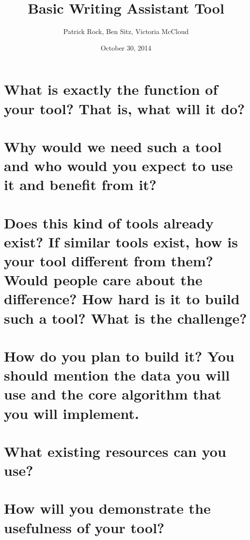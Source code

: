\documentclass{article}
\title{Basic Writing Assistant Tool}
\author{Patrick Rock, Ben Sitz, Victoria McCloud}
\date{October 30, 2014}
\begin{document}
\maketitle

\section{What is exactly the function of your tool? That is, what will it do?}

\section{Why would we need such a tool and who would you expect to use it and benefit from it?}

\section{Does this kind of tools already exist? If similar tools exist, how is your tool different from them? Would people care about the difference? How hard is it to build such a tool? What is the challenge?}

\section{How do you plan to build it? You should mention the data you will use and the core algorithm that you will implement.}

\section{What existing resources can you use?}

\section{How will you demonstrate the usefulness of your tool?}
\end{document}
